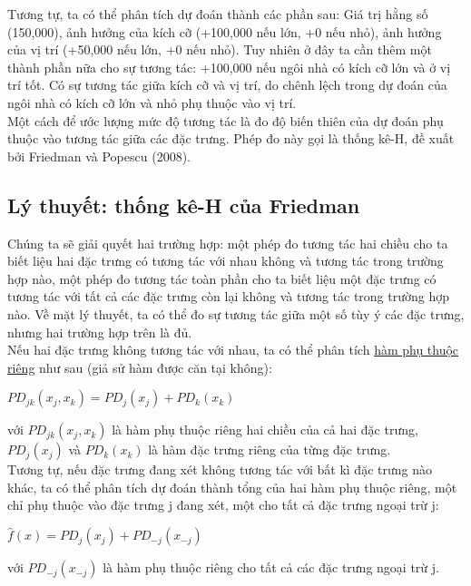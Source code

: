 Tương tự, ta có thể phân tích dự đoán thành các phần sau: Giá trị hằng số (150,000), ảnh hưởng của kích cỡ (+100,000 nếu lớn, +0 nếu nhỏ), ảnh hưởng của vị trí (+50,000 nếu lớn, +0 nếu nhỏ). Tuy nhiên ở đây ta cần thêm một thành phần nữa cho sự tương tác: +100,000 nếu ngôi nhà có kích cỡ lớn và ở vị trí tốt. Có sự tương tác giữa kích cỡ và vị trí, do chênh lệch trong dự đoán của ngôi nhà có kích cỡ lớn và nhỏ phụ thuộc vào vị trí.\\
Một cách để ước lượng mức độ tương tác là đo độ biến thiên của dự đoán phụ thuộc vào tương tác giữa các đặc trưng. Phép đo này gọi là thống kê-H, đề xuất bởi Friedman và Popescu (2008).
\subsection{Lý thuyết: thống kê-H của Friedman}
Chúng ta sẽ giải quyết hai trường hợp: một phép đo tương tác hai chiều cho ta biết liệu hai đặc trưng có tương tác với nhau không và tương tác trong trường hợp nào, một phép đo tương tác toàn phần cho ta biết liệu một đặc trưng có tương tác với tất cả các đặc trưng còn lại không và tương tác trong trường hợp nào. Về mặt lý thuyết, ta có thể đo sự tương tác giữa một số tùy ý các đặc trưng, nhưng hai trường hợp trên là đủ.\\
Nếu hai đặc trưng không tương tác với nhau, ta có thể phân tích \href{Chapter_5.1}{hàm phụ thuộc riêng} như sau (giả sử hàm được căn tại không):\\
\begin{center}
    $PD_{jk}(x_j,x_k)=PD_j(x_j)+PD_k(x_k)$
\end{center}
với $PD_{jk}(x_j,x_k)$ là hàm phụ thuộc riêng hai chiều của cả hai đặc trưng, $PD_j(x_j)$ và $PD_k(x_k)$ là hàm đặc trưng riêng của từng đặc trưng.\\
Tương tự, nếu đặc trưng đang xét không tương tác với bất kì đặc trưng nào khác, ta có thể phân tích dự đoán thành tổng của hai hàm phụ thuộc riêng, một chỉ phụ thuộc vào đặc trưng j đang xét, một cho tất cả đặc trưng ngoại trừ j:\\
\begin{center}
    $\hat{f}(x)=PD_j(x_j)+PD_{-j}(x_{-j})$
\end{center}
với $PD_{-j}(x_{-j})$ là hàm phụ thuộc riêng cho tất cả các đặc trưng ngoại trừ j.\\
